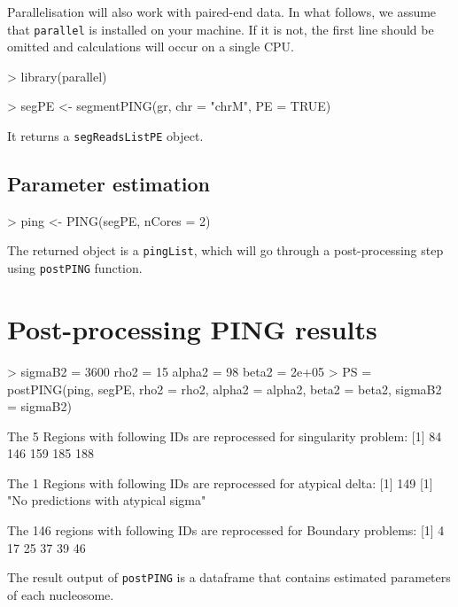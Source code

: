 \documentclass[11pt]{article}
\begin{document}
Parallelisation will also work with paired-end data. In what follows, we assume that \texttt{parallel} is installed on your machine. If it is not, the first line should be omitted and calculations will occur on a single CPU.

\begin{Schunk}
\begin{Sinput}
> library(parallel)
\end{Sinput}
\end{Schunk}


\begin{Schunk}
\begin{Sinput}
> segPE <- segmentPING(gr, chr = "chrM", PE = TRUE)
\end{Sinput}
\end{Schunk}

It returns a \texttt{segReadsListPE} object.


\subsection{Parameter estimation}

\begin{Schunk}
\begin{Sinput}
> ping <- PING(segPE, nCores = 2)
\end{Sinput}
\end{Schunk}
The returned object is a \texttt{pingList}, which will go through a post-processing step using \texttt{postPING} function.


\section{Post-processing PING results}

\begin{Schunk}
\begin{Sinput}
> {
     sigmaB2 = 3600
     rho2 = 15
     alpha2 = 98
     beta2 = 2e+05
 }
> PS = postPING(ping, segPE, rho2 = rho2, alpha2 = alpha2, beta2 = beta2, 
     sigmaB2 = sigmaB2)
\end{Sinput}
\begin{Soutput}
 The 5 Regions with following IDs are reprocessed for singularity problem: 
[1]  84 146 159 185 188

 The 1 Regions with following IDs are reprocessed for atypical delta: 
[1] 149
[1] "No predictions with atypical sigma"

 The 146 regions with following IDs are reprocessed for Boundary problems: 
[1]  4 17 25 37 39 46
\end{Soutput}
\end{Schunk}
The result output of \texttt{postPING} is a dataframe that contains estimated parameters of each nucleosome.
\end{document}
